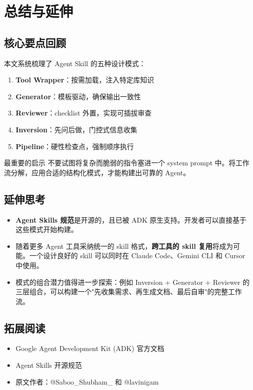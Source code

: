 \section{总结与延伸}

\subsection{核心要点回顾}

本文系统梳理了 Agent Skill 的五种设计模式：

\begin{enumerate}
    \item \textbf{Tool Wrapper}：按需加载，注入特定库知识
    \item \textbf{Generator}：模板驱动，确保输出一致性
    \item \textbf{Reviewer}：checklist 外置，实现可插拔审查
    \item \textbf{Inversion}：先问后做，门控式信息收集
    \item \textbf{Pipeline}：硬性检查点，强制顺序执行
\end{enumerate}

\begin{warningbox}{最重要的启示}
不要试图将复杂而脆弱的指令塞进一个 system prompt 中。将工作流分解，应用合适的结构化模式，才能构建出可靠的 Agent。
\end{warningbox}

\subsection{延伸思考}

\begin{itemize}
    \item \textbf{Agent Skills 规范}是开源的，且已被 ADK 原生支持。开发者可以直接基于这些模式开始构建。
    \item 随着更多 Agent 工具采纳统一的 skill 格式，\textbf{跨工具的 skill 复用}将成为可能。一个设计良好的 skill 可以同时在 Claude Code、Gemini CLI 和 Cursor 中使用。
    \item 模式的组合潜力值得进一步探索：例如 Inversion + Generator + Reviewer 的三层组合，可以构建一个"先收集需求、再生成文档、最后自审"的完整工作流。
\end{itemize}

\subsection{拓展阅读}

\begin{itemize}
    \item Google Agent Development Kit (ADK) 官方文档
    \item Agent Skills 开源规范
    \item 原文作者：@Saboo\_Shubham\_ 和 @lavinigam
\end{itemize}



